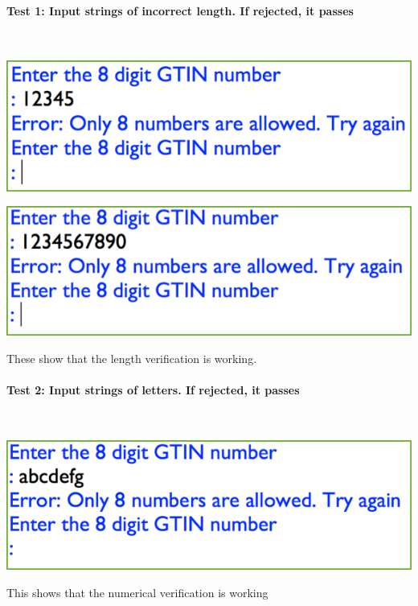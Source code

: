 \documentclass[a4paper]{article}
\begin{document}
\paragraph{Test 1: Input strings of incorrect length. If rejected, it passes} ~\par
\noindent\includegraphics{testing_1.png} \par 
\noindent\includegraphics{testing_2.png} \par 
These show that the length verification is working.
\paragraph{Test 2: Input strings of letters. If rejected, it passes} ~\par 
\noindent\includegraphics{testing_3.png} \par 
This shows that the numerical verification is working
\end{document}
